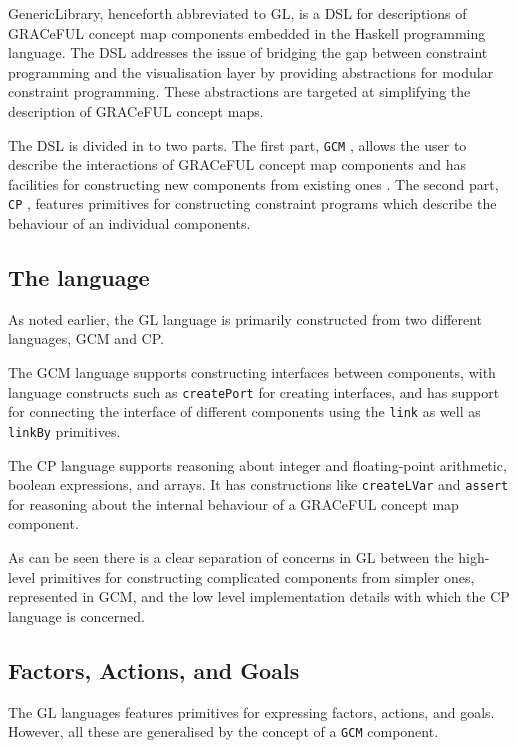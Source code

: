 GenericLibrary, henceforth abbreviated to GL, is a DSL for descriptions
of GRACeFUL concept map components embedded in the Haskell programming language.
The DSL addresses the issue of bridging the gap between constraint programming
and the visualisation layer by providing abstractions for modular constraint programming.
These abstractions are targeted at simplifying the description of GRACeFUL concept maps.

The DSL is divided in to two parts. The first part, \texttt{GCM} ,
allows the user to describe the interactions of GRACeFUL concept map components
and has facilities for constructing new components from existing ones . The second part,
\texttt{CP} , features primitives for constructing constraint programs
which describe the behaviour of an individual components.


\subsection{The language}
As noted earlier, the GL language is primarily constructed from two different languages,
GCM and CP.

The GCM language supports constructing interfaces between components,
with language constructs such as \texttt{createPort} for creating interfaces, and has support for
connecting the interface of different components using the \texttt{link}
as well as \texttt{linkBy} primitives.

The CP language supports reasoning about integer and floating-point arithmetic, boolean expressions,
and arrays. It has constructions like \texttt{createLVar} and \texttt{assert} for reasoning about
the internal behaviour of a GRACeFUL concept map component.

As can be seen there is a clear separation of concerns in GL between the high-level primitives
for constructing complicated components from simpler ones, represented in GCM, and the low level
implementation details with which the CP language is concerned.

\subsection{Factors, Actions, and Goals}
The GL languages features primitives for expressing factors, actions, and goals. However, all these are
generalised by the concept of a \texttt{GCM} component.
